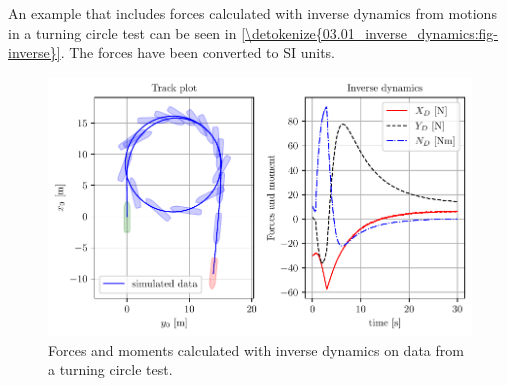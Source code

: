 \noindent An example that includes forces calculated with inverse dynamics from motions in a turning circle test can be seen in \hyperref[\detokenize{03.01_inverse_dynamics:fig-inverse}]{\autoref{\detokenize{03.01_inverse_dynamics:fig-inverse}}}. The forces have been converted to SI units.

\begin{figure}[H]
    \centering
    \includegraphics[width=\textwidth]{kappa/images/1.pdf}
    \caption{Forces and moments calculated with inverse dynamics on data from a turning circle test.}
    \label{\detokenize{03.01_inverse_dynamics:fig-inverse}}
\end{figure}

